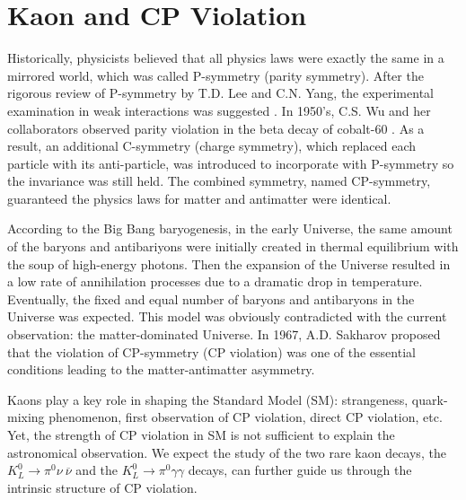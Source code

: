 
\chapter{Kaon and CP Violation} %

\label{Chapter1} %

%

Historically, physicists believed that all physics laws were exactly the same in a mirrored world, which was called P-symmetry (parity symmetry). After the rigorous review of P-symmetry by T.D. Lee and C.N. Yang, the experimental examination in weak interactions was suggested \parencite{P_theory}. In 1950’s, C.S. Wu and her collaborators observed parity violation in the beta decay of cobalt-60 \parencite{P_violation_exp}. As a result, an additional C-symmetry (charge symmetry), which replaced each particle with its anti-particle, was introduced to incorporate with P-symmetry so the invariance was still held. The combined symmetry, named CP-symmetry, guaranteed the physics laws for matter and antimatter were identical. 


According to the Big Bang baryogenesis, in the early Universe, the same amount of the baryons and antibariyons were initially created in thermal equilibrium with the soup of high-energy photons. Then the expansion of the Universe resulted in a low rate of annihilation processes due to a dramatic drop in temperature. Eventually, the fixed and equal number of baryons and antibaryons in the Universe was expected. This model was obviously contradicted with the current observation: the matter-dominated Universe. In 1967, A.D. Sakharov \parencite{Sakharov} proposed that the violation of CP-symmetry (CP violation) was one of the essential conditions leading to the matter-antimatter asymmetry. 

Kaons play a key role in shaping the Standard Model (SM): strangeness, quark-mixing phenomenon, first observation of CP violation, direct CP violation, etc. Yet, the strength of CP violation in SM is not sufficient to explain the astronomical observation. We expect the study of the two rare kaon decays, the ${K_L^0\to\pi^0\nu~\overline{\nu}}$ and the ${K_L^0\to\pi^0\gamma\gamma}$ decays, can further guide us through the intrinsic structure of CP violation.

